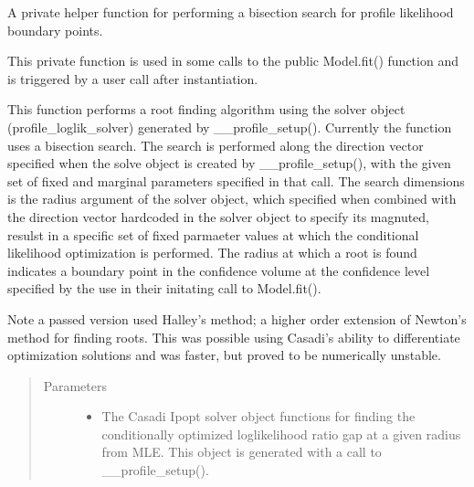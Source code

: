 \documentclass[letterpaper,10pt,english,openany,oneside]{sphinxmanual}
\begin{document}
\begin{fulllineitems}

\begin{fulllineitems}
\label{\detokenize{nloed:nloed.model.Model.__loglik_search}}
A private helper function for performing a bisection search for profile likelihood
boundary points.

This private function is used in some calls to the public Model.fit() function and is
triggered by a user call after instantiation.

This function performs a root finding algorithm using the solver object  (profile\_loglik\_solver)
generated by \_\_profile\_setup(). Currently the function uses a bisection search. The search
is performed along the direction vector specified when the solve object is created by
\_\_profile\_setup(), with the given set of fixed and marginal parameters specified in that
call. The search dimensions is the radius argument of the solver object, which specified when
combined with the direction vector hard\sphinxhyphen{}coded in the solver object to specify its magnuted,
resulst in a specific set of fixed parmaeter values at which the conditional likelihood
optimization is performed. The radius at which a root is found indicates a boundary point in
the confidence volume at the confidence level specified by the use in their initating call to
Model.fit().

Note a passed version used Halley’s method; a higher order extension of Newton’s method for
finding roots. This was possible using Casadi’s ability to differentiate optimization solutions
and was faster, but proved to be numerically unstable.
\begin{quote}\begin{description}
\item[{Parameters}] \leavevmode\begin{itemize}
\item {} 
 \textendash{} The Casadi Ipopt solver object functions for finding the conditionally
optimized loglikelihood ratio gap at a given radius from MLE. This object is generated
with a call to \_\_profile\_setup().


\end{itemize}
\end{description}
\end{quote}
\end{fulllineitems}
\end{fulllineitems}
\end{document}
